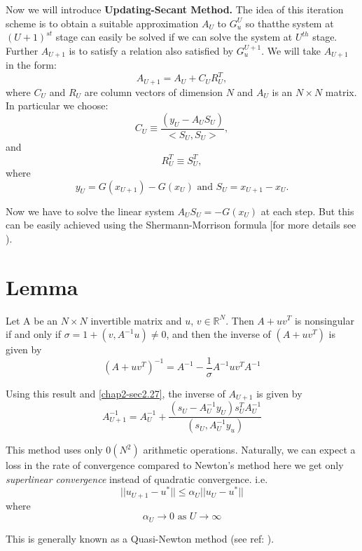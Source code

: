  Now we will introduce \textbf{Updating-Secant Method.} The idea of this
 iteration scheme is to obtain a suitable approximation $A_U$ to
 $G^U_u$ so that\pageoriginale the system at $(U+1)^{st}$ stage can easily be
 solved if we can solve the system at $U^{th}$ stage. Further
 $A_{U+1}$ is to satisfy a relation also satisfied by $G^{U+1}_u$. We
 will take $A_{U+1}$ in the form: 
 \begin{equation*}
A_{U+1} = A_{U}+ C_UR_U^T, \tag{2.28}\label{chap2-sec2.27-eq2.28}
  \end{equation*}  
  where $C_U$ and $R_U$ are column vectors of dimension $N$ and $A_U$
  is an $N \times N$ matrix. In particular we choose: 
  $$
  C_U \equiv \frac{(y_U - A_U S_U)}{< S_U, S_U>}, 
  $$
  and  
  $$
  R^T_U \equiv S^T_U,
  $$
  where 
  $$
  y_U = G(x_{U+1}) - G(x_U) \text{ and } S_U = x_{U+1} - x_U.  
  $$

  Now we have to solve the linear system $A_US_U = - G(x_U)$ at each
  step. But this can be easily achieved using the Shermann-Morrison
  formula [for more details see \cite{key12}). 

\setcounter{section}{28}
\section{Lemma}\label{chap2-sec2.29}%

Let A be an  $N \times N$ invertible matrix and  $u$, $v \in
    \mathbb{R}^N$. Then $A+uv^T$ is nonsingular if and only if
    $\sigma = 1+(v, A^{-1} u)\neq 0$, and then the inverse of
    $(A+uv^T)$ is given by 
  \begin{equation*}
(A+uv^T)^{-1} = A^{-1} - \frac{1}{\sigma} A^{-1}uv^TA^{-1} \tag{2.29a} 
\label{chap2-sec2.29-eq2.29a}
\end{equation*}  

Using this result and \eqref{chap2-sec2.27}, the inverse of $A_{U+1}$
is given by   
  \begin{equation*}
A^{-1}_{U + 1} = A^{-1}_U + \frac{(s_U - A_U^{-1} y_U) s^T_U
  A^{-1}_U}{(s_U, A_U^{-1}y_u)} \tag{2.29b} \label{chap2-sec2.29-eq2.29b}
\end{equation*}\pageoriginale  

This method uses only $0(N^2)$ arithmetic operations. Naturally, we
can expect a loss in the rate of convergence compared to Newton's
method here we get only \textit{superlinear convergence} instead of
quadratic convergence. i.e.  
$$
|| u_{U+1} - u^* || \leq \alpha_U || u_U - u^* ||  
$$
where 
$$
\alpha_U \to 0 \text{ as } U \to \infty 
$$

This is generally  known as a Quasi-Newton method (see ref: \cite{key9}).  

